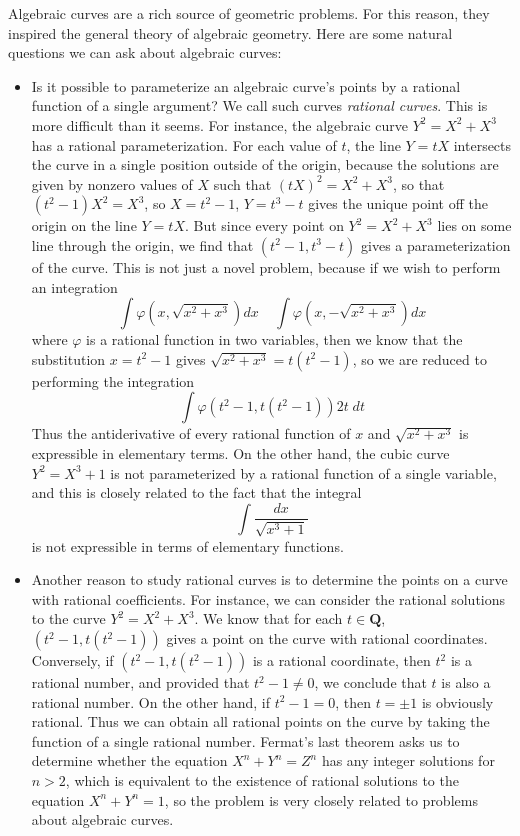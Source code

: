 Algebraic curves are a rich source of geometric problems. For this reason, they inspired the general theory of algebraic geometry. Here are some natural questions we can ask about algebraic curves:
%
\begin{itemize}
    \item Is it possible to parameterize an algebraic curve's points by a rational function of a single argument? We call such curves \emph{rational curves}. This is more difficult than it seems. For instance, the algebraic curve $Y^2 = X^2 + X^3$ has a rational parameterization. For each value of $t$, the line $Y = tX$ intersects the curve in a single position outside of the origin, because the solutions are given by nonzero values of $X$ such that $(tX)^2 = X^2 + X^3$, so that $(t^2 - 1)X^2 = X^3$, so $X = t^2 - 1$, $Y = t^3 - t$ gives the unique point off the origin on the line $Y = tX$. But since every point on $Y^2 = X^2 + X^3$ lies on some line through the origin, we find that $(t^2 - 1, t^3 - t)$ gives a parameterization of the curve. This is not just a novel problem, because if we wish to perform an integration
    \[ \int \varphi \left(x, \sqrt{x^2 + x^3} \right) dx\ \ \ \ \ \int \varphi \left( x, - \sqrt{x^2 + x^3} \right) dx \]
    where $\varphi$ is a rational function in two variables, then we know that the substitution $x = t^2 - 1$ gives $\sqrt{x^2 + x^3} = t(t^2 - 1)$, so we are reduced to performing the integration
    \[ \int \varphi(t^2 - 1, t(t^2 - 1)) 2t\; dt \]
    Thus the antiderivative of every rational function of $x$ and $\sqrt{x^2 + x^3}$ is expressible in elementary terms. On the other hand, the cubic curve $Y^2 = X^3 + 1$ is not parameterized by a rational function of a single variable, and this is closely related to the fact that the integral
    \[ \int \frac{dx}{\sqrt{x^3 + 1}} \]
    is not expressible in terms of elementary functions.

    \item Another reason to study rational curves is to determine the points on a curve with rational coefficients. For instance, we can consider the rational solutions to the curve $Y^2 = X^2 + X^3$. We know that for each $t \in \mathbf{Q}$, $(t^2 - 1, t(t^2 - 1))$ gives a point on the curve with rational coordinates. Conversely, if $(t^2 - 1, t(t^2 - 1))$ is a rational coordinate, then $t^2$ is a rational number, and provided that $t^2 - 1 \neq 0$, we conclude that $t$ is also a rational number. On the other hand, if $t^2 - 1 = 0$, then $t = \pm 1$ is obviously rational. Thus we can obtain all rational points on the curve by taking the function of a single rational number. Fermat's last theorem asks us to determine whether the equation $X^n + Y^n = Z^n$ has any integer solutions for $n > 2$, which is equivalent to the existence of rational solutions to the equation $X^n + Y^n = 1$, so the problem is very closely related to problems about algebraic curves.


\end{itemize}
